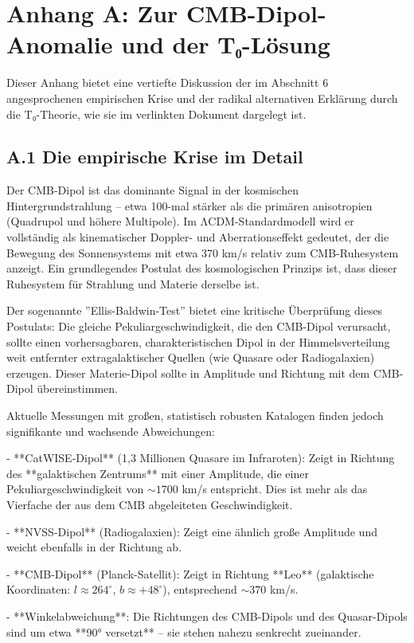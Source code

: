 \documentclass[12pt,a4paper]{article}
\begin{document}
	\section*{Anhang A: Zur CMB-Dipol-Anomalie und der T₀-Lösung}
	
	Dieser Anhang bietet eine vertiefte Diskussion der im Abschnitt 6 angesprochenen empirischen Krise und der radikal alternativen Erklärung durch die T₀-Theorie, wie sie im verlinkten Dokument dargelegt ist.
	
	\subsection*{A.1 Die empirische Krise im Detail}
	
	Der CMB-Dipol ist das dominante Signal in der kosmischen Hintergrundstrahlung – etwa 100-mal stärker als die primären anisotropien (Quadrupol und höhere Multipole). Im ΛCDM-Standardmodell wird er vollständig als kinematischer Doppler- und Aberrationseffekt gedeutet, der die Bewegung des Sonnensystems mit etwa 370 km/s relativ zum CMB-Ruhesystem anzeigt. Ein grundlegendes Postulat des kosmologischen Prinzips ist, dass dieser Ruhesystem für Strahlung und Materie derselbe ist. 
	
	Der sogenannte ''Ellis-Baldwin-Test'' bietet eine kritische Überprüfung dieses Postulats: Die gleiche Pekuliargeschwindigkeit, die den CMB-Dipol verursacht, sollte einen vorhersagbaren, charakteristischen Dipol in der Himmelsverteilung weit entfernter extragalaktischer Quellen (wie Quasare oder Radiogalaxien) erzeugen. Dieser Materie-Dipol sollte in Amplitude und Richtung mit dem CMB-Dipol übereinstimmen.
	
	Aktuelle Messungen mit großen, statistisch robusten Katalogen finden jedoch signifikante und wachsende Abweichungen:
	
	- **CatWISE-Dipol** (1,3 Millionen Quasare im Infraroten): Zeigt in Richtung des **galaktischen Zentrums** mit einer Amplitude, die einer Pekuliargeschwindigkeit von $\sim 1700$ km/s entspricht. Dies ist mehr als das Vierfache der aus dem CMB abgeleiteten Geschwindigkeit.
	
	- **NVSS-Dipol** (Radiogalaxien): Zeigt eine ähnlich große Amplitude und weicht ebenfalls in der Richtung ab.
	
	- **CMB-Dipol** (Planck-Satellit): Zeigt in Richtung **Leo** (galaktische Koordinaten: $l \approx 264^\circ$, $b \approx +48^\circ$), entsprechend $\sim 370$ km/s.
	
	- **Winkelabweichung**: Die Richtungen des CMB-Dipols und des Quasar-Dipols sind um etwa **90° versetzt** – sie stehen nahezu senkrecht zueinander.
	
\end{document}
